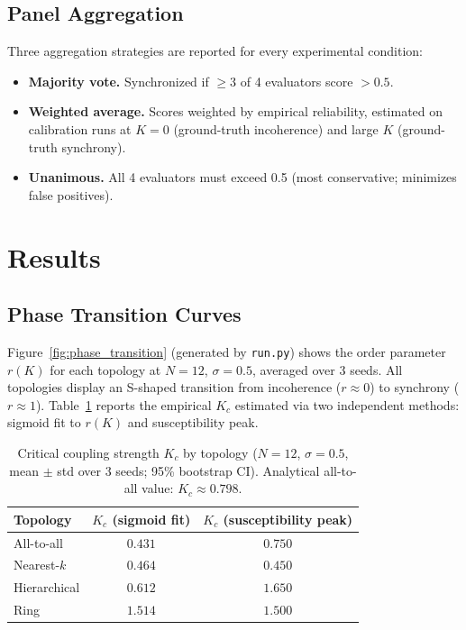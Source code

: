 \documentclass[11pt]{article}
\begin{document}
\subsection{Panel Aggregation}

Three aggregation strategies are reported for every experimental condition:

\begin{itemize}
  \item \textbf{Majority vote.} Synchronized if $\geq 3$ of 4 evaluators score $> 0.5$.
  \item \textbf{Weighted average.} Scores weighted by empirical reliability, estimated
    on calibration runs at $K = 0$ (ground-truth incoherence) and large $K$
    (ground-truth synchrony).
  \item \textbf{Unanimous.} All 4 evaluators must exceed 0.5 (most conservative;
    minimizes false positives).
\end{itemize}

\section{Results}

\subsection{Phase Transition Curves}

Figure~\ref{fig:phase_transition} (generated by \texttt{run.py}) shows the order
parameter $r(K)$ for each topology at $N = 12$, $\sigma = 0.5$, averaged over 3 seeds.
All topologies display an S-shaped transition from incoherence ($r \approx 0$) to
synchrony ($r \approx 1$). Table~\ref{tab:kc} reports the empirical $K_c$ estimated
via two independent methods: sigmoid fit to $r(K)$ and susceptibility peak.

\begin{table}[h]
\centering
\small
\caption{Critical coupling strength $K_c$ by topology ($N=12$, $\sigma=0.5$, mean
  $\pm$ std over 3 seeds; 95\% bootstrap CI). Analytical all-to-all value:
  $K_c \approx 0.798$.}
\label{tab:kc}
\begin{tabular}{lcc}
\toprule
\textbf{Topology} & \textbf{$K_c$ (sigmoid fit)} & \textbf{$K_c$ (susceptibility peak)} \\
\midrule
All-to-all    & $0.431$ & $0.750$ \\
Nearest-$k$   & $0.464$ & $0.450$ \\
Hierarchical  & $0.612$ & $1.650$ \\
Ring          & $1.514$ & $1.500$ \\
\bottomrule
\end{tabular}
\end{table}
\end{document}
